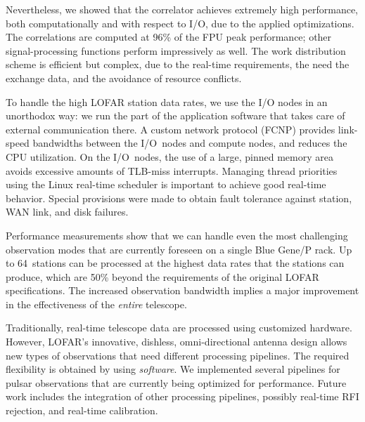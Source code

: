 \documentclass{sig-alternate}
\begin{document}
Nevertheless, we showed that the correlator achieves extremely high performance,
both computationally and with respect to I/O, due to the applied optimizations.
The correlations are computed at 96\% of the FPU peak performance; other
signal-processing functions perform impressively as well.
The work distribution scheme is efficient but complex, due to the real-time
requirements, the need the exchange data, and the avoidance of resource
conflicts.

To handle the high LOFAR station data rates, we use the I/O nodes in an
unorthodox way: we run the part of the application software that takes care
of external communication there.
A custom network protocol (FCNP) provides link-speed bandwidths between the
I/O~nodes and compute nodes, and reduces the CPU utilization.
On the I/O~nodes, the use of a large, pinned memory area avoids excessive
amounts of TLB-miss interrupts.
Managing thread priorities using the Linux real-time scheduler is important to 
achieve good real-time behavior.
Special provisions were made to obtain fault tolerance against
station, WAN link, and disk failures.

Performance measurements show that we can handle even the most challenging
observation modes that are currently foreseen on a single Blue Gene/P rack.
Up to 64~stations can be processed at the highest data rates that the
stations can produce, which are 50\% beyond the requirements of the original
LOFAR specifications.
The increased observation bandwidth implies a major improvement in the
effectiveness of the \emph{entire\/} telescope.

Traditionally, real-time telescope data are processed using customized hardware.
However, LOFAR's innovative, dishless, omni-directional antenna design allows
new types of observations that need different processing pipelines.
The required flexibility is obtained by using \emph{software}.
We implemented several pipelines for pulsar observations that are currently
being optimized for performance.
Future work includes the integration of other processing pipelines,
possibly real-time RFI rejection, and real-time calibration.
\end{document}
